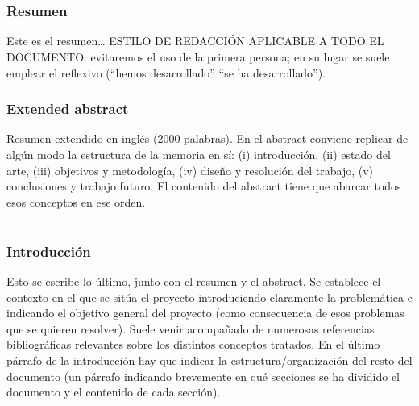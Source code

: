\documentclass[12pt]{article}
\begin{document}
\pagestyle{empty}
\setcounter{page}{1}
\part*{}
\tableofcontents
\newpage
\listoffigures
\newpage
\clearpage
\pagestyle{fancy}

\section{Resumen}
Este es el resumen…
ESTILO DE REDACCIÓN APLICABLE A TODO EL DOCUMENTO: evitaremos el uso de la primera persona; en su lugar se suele emplear el reflexivo (“hemos desarrollado” “se ha desarrollado”).

\clearpage

\section{Extended abstract}
Resumen extendido en inglés (2000 palabras). En el abstract conviene replicar de algún modo la estructura de la memoria en sí: (i) introducción, (ii) estado del arte, (iii) objetivos y metodología, (iv) diseño y resolución del trabajo, (v) conclusiones y trabajo futuro. El contenido del abstract tiene que abarcar todos esos conceptos en ese orden.

\cleardoublepage

\part*{}
\setcounter{page}{1} %

\section{Introducción}
Esto se escribe lo último, junto con el resumen y el abstract. Se establece el contexto en el que se sitúa el proyecto introduciendo claramente la problemática e indicando el objetivo general del proyecto (como consecuencia de esos problemas que se quieren resolver). Suele venir acompañado de numerosas referencias bibliográficas relevantes sobre los distintos conceptos tratados. En el último párrafo de la introducción hay que indicar la estructura/organización del resto del documento (un párrafo indicando brevemente en qué secciones se ha dividido el documento y el contenido de cada sección).
\end{document}
